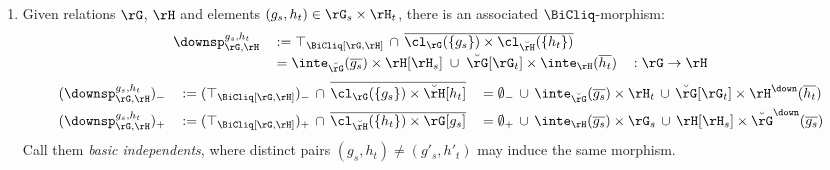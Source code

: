 \documentclass{article}
\begin{document}
\begin{definition}
\begin{enumerate}
\item
Given relations $\rG$, $\rH$ and elements $(g_s,h_t) \in \rG_s \times \rH_t$, there is an associated $\BiCliq$-morphism:
\[
\begin{tabular}{lll}
$\downsp_{\rG,\rH}^{g_s,h_t}$
& $:= \top_{\BiCliq[\rG,\rH]} \, \cap \, \overline{\cl_\rG(\{g_s\}) \times \cl_{\breve{\rH}}(\{h_t\})}$
\\[0.5ex]&
$= \inte_{\breve{\rG}}(\overline{g_s}) \times \rH[\rH_s] \;\cup\; \breve{\rG}[\rG_t] \times \inte_\rH(\overline{h_t})$
& $: \rG \to \rH$
\end{tabular}
\]
\[
\begin{tabular}{llll}
$(\downsp_{\rG,\rH}^{g_s,h_t})_-$
&
$:= (\top_{\BiCliq[\rG,\rH]})_- \,\cap\, \overline{\cl_\rG(\{g_s\}) \times \breve{\rH}[h_t]}$
&
$= \emptyset_- \, \cup \, \inte_{\breve{\rG}}(\overline{g_s}) \times \rH_t \, \cup \, \breve{\rG}[\rG_t] \times \rH^\down(\overline{h_t})$
\\[1ex]
$(\downsp_{\rG,\rH}^{g_s,h_t})_+$
&
$:= (\top_{\BiCliq[\rG,\rH]})_+ \,\cap\, \overline{\cl_{\breve{\rH}}(\{h_t\}) \times \rG[g_s]}$
&
$= \emptyset_+ \,\cup\, \inte_\rH(\overline{g_s}) \times \rG_s \,\cup\, \rH[\rH_s] \times \breve{\rG}^\down(\overline{g_s})$
\end{tabular}
\]
Call them \emph{basic independents}, where distinct pairs $(g_s,h_t) \neq (g'_s,h'_t)$ may induce the same morphism. \endbox


\end{enumerate}
\end{definition}
\end{document}
